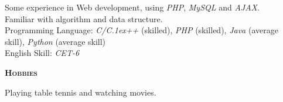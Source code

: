 \documentclass[a4paper]{article}
\newenvironment{changemargin}[2]{%
  \begin{list}{}{%
    \setlength{\topsep}{0pt}%
    \setlength{\leftmargin}{#1}%
    \setlength{\rightmargin}{#2}%
    \setlength{\listparindent}{\parindent}%
    \setlength{\itemindent}{\parindent}%
    \setlength{\parsep}{\parskip}%
  }%
  \item[]}{\end{list}
}
\newcommand{\lineover}{
	\begin{changemargin}{-0.05in}{-0.05in}
		\vspace*{-8pt}
		\hrulefill \\
		\vspace*{-2pt}
	\end{changemargin}
}
\newcommand{\header}[1]{
	\begin{changemargin}{-0.5in}{-0.5in}
		\scshape{\textbf{#1}}\\
	\end{changemargin}
}
\newenvironment{body} {
	\vspace*{-16pt}
	\begin{changemargin}{-0.25in}{-0.5in}
  }	
	{\end{changemargin}
}
\begin{document}
\begin{body}
	\vspace{14pt}
	Some experience in Web development, using \emph{PHP}, \emph{MySQL} and \emph{AJAX}.\\ Familiar with algorithm and data structure.\\
	Programming Language: \emph{C/C\raise.1ex\hbox{\small++}} {(skilled)}, \emph{PHP} {(skilled)}, \emph{Java} {(average skill)}, \emph{Python} {(average skill)} \\
	English Skill: \emph{CET-6}\\
\end{body}

\medskip


\header{Hobbies}

\begin{body}
	\vspace{14pt}
	Playing table tennis and watching movies.\\
\end{body}
\end{document}
